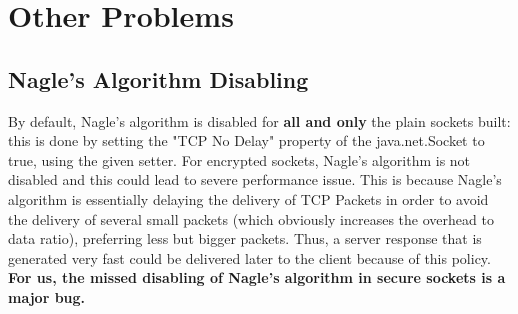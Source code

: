 \section{Other Problems}
\subsection{Nagle's Algorithm Disabling}
By default, Nagle's algorithm is disabled for \textbf{all and only} the plain sockets built: this is done by setting the "TCP No Delay" property of the java.net.Socket to true, using the given setter.
For encrypted sockets, Nagle's algorithm is not disabled and this could lead to severe performance issue.
This is because Nagle's algorithm is essentially delaying the delivery of TCP Packets in order to avoid the delivery of several small packets (which obviously increases the overhead to data ratio), preferring less but bigger packets.
Thus, a server response that is generated very fast could be delivered later to the client because of this policy.
\textbf{For us, the missed disabling of Nagle's algorithm in secure sockets is a major bug.}